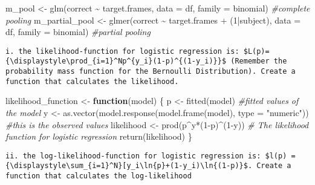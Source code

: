 \documentclass[
]{article}
\newenvironment{Shaded}{\begin{snugshade}}{\end{snugshade}}
\newcommand{\AttributeTok}[1]{\textcolor[rgb]{0.77,0.63,0.00}{#1}}
\newcommand{\CommentTok}[1]{\textcolor[rgb]{0.56,0.35,0.01}{\textit{#1}}}
\newcommand{\ControlFlowTok}[1]{\textcolor[rgb]{0.13,0.29,0.53}{\textbf{#1}}}
\newcommand{\DecValTok}[1]{\textcolor[rgb]{0.00,0.00,0.81}{#1}}
\newcommand{\FunctionTok}[1]{\textcolor[rgb]{0.00,0.00,0.00}{#1}}
\newcommand{\NormalTok}[1]{#1}
\newcommand{\OtherTok}[1]{\textcolor[rgb]{0.56,0.35,0.01}{#1}}
\newcommand{\SpecialCharTok}[1]{\textcolor[rgb]{0.00,0.00,0.00}{#1}}
\newcommand{\StringTok}[1]{\textcolor[rgb]{0.31,0.60,0.02}{#1}}
\begin{document}
\begin{Shaded}
\begin{Highlighting}[]
\NormalTok{m\_pool }\OtherTok{\textless{}{-}} \FunctionTok{glm}\NormalTok{(correct }\SpecialCharTok{\textasciitilde{}}\NormalTok{ target.frames, }\AttributeTok{data =}\NormalTok{ df, }\AttributeTok{family =}\NormalTok{ binomial) }\CommentTok{\#complete pooling}
\NormalTok{m\_partial\_pool }\OtherTok{\textless{}{-}} \FunctionTok{glmer}\NormalTok{(correct }\SpecialCharTok{\textasciitilde{}}\NormalTok{ target.frames }\SpecialCharTok{+}\NormalTok{ (}\DecValTok{1}\SpecialCharTok{|}\NormalTok{subject), }\AttributeTok{data =}\NormalTok{ df, }\AttributeTok{family =}\NormalTok{ binomial) }\CommentTok{\#partial pooling }
\end{Highlighting}
\end{Shaded}

\begin{verbatim}
i. the likelihood-function for logistic regression is: $L(p)={\displaystyle\prod_{i=1}^Np^{y_i}(1-p)^{(1-y_i)}}$ (Remember the probability mass function for the Bernoulli Distribution). Create a function that calculates the likelihood.  
\end{verbatim}

\begin{Shaded}
\begin{Highlighting}[]
\NormalTok{likelihood\_function }\OtherTok{\textless{}{-}} \ControlFlowTok{function}\NormalTok{(model) \{}
\NormalTok{  p }\OtherTok{\textless{}{-}} \FunctionTok{fitted}\NormalTok{(model) }\CommentTok{\#fitted values of the model}
\NormalTok{  y }\OtherTok{\textless{}{-}} \FunctionTok{as.vector}\NormalTok{(}\FunctionTok{model.response}\NormalTok{(}\FunctionTok{model.frame}\NormalTok{(model), }\AttributeTok{type =} \StringTok{"numeric"}\NormalTok{)) }\CommentTok{\#this is the observed values}
\NormalTok{  likelihood }\OtherTok{\textless{}{-}}  \FunctionTok{prod}\NormalTok{(p}\SpecialCharTok{\^{}}\NormalTok{y}\SpecialCharTok{*}\NormalTok{(}\DecValTok{1}\SpecialCharTok{{-}}\NormalTok{p)}\SpecialCharTok{\^{}}\NormalTok{(}\DecValTok{1}\SpecialCharTok{{-}}\NormalTok{y)) }\CommentTok{\# The likelihood function for logistic regression}
  \FunctionTok{return}\NormalTok{(likelihood)}
\NormalTok{\}}
\end{Highlighting}
\end{Shaded}

\begin{verbatim}
ii. the log-likelihood-function for logistic regression is: $l(p) = {\displaystyle\sum_{i=1}^N}[y_i\ln{p}+(1-y_i)\ln{(1-p)}$. Create a function that calculates the log-likelihood  
\end{verbatim}
\end{document}
